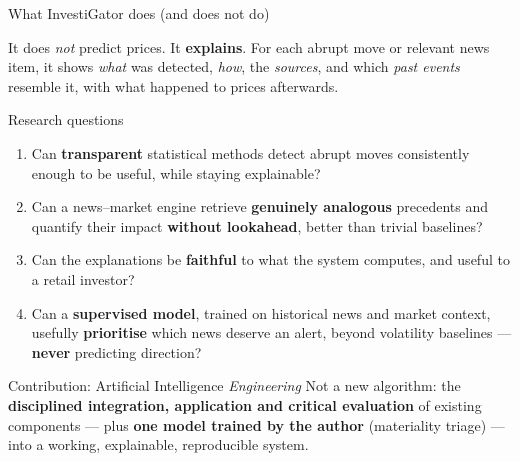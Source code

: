 \documentclass[aspectratio=169]{beamer}
\begin{document}
\begin{frame}{What InvestiGator does (and does not do)}
\begin{block}{It does \emph{not} predict prices. It \textbf{explains}.}
For each abrupt move or relevant news item, it shows \emph{what} was detected, \emph{how}, the \emph{sources}, and which \emph{past events} resemble it, with what happened to prices afterwards.
\end{block}
\centering
{}
\end{frame}

\begin{frame}{Research questions}
\begin{enumerate}
  \item[\textbf{RQ1}] Can \textbf{transparent} statistical methods detect abrupt moves consistently enough to be useful, while staying explainable?
  \item[\textbf{RQ2}] Can a news--market engine retrieve \textbf{genuinely analogous} precedents and quantify their impact \textbf{without lookahead}, better than trivial baselines?
  \item[\textbf{RQ3}] Can the explanations be \textbf{faithful} to what the system computes, and useful to a retail investor?
  \item[\textbf{RQ4}] Can a \textbf{supervised model}, trained on historical news and market context, usefully \textbf{prioritise} which news deserve an alert, beyond volatility baselines --- \textbf{never} predicting direction?
\end{enumerate}
\vfill
\begin{block}{Contribution: Artificial Intelligence \emph{Engineering}}
Not a new algorithm: the \textbf{disciplined integration, application and critical evaluation} of existing components --- plus \textbf{one model trained by the author} (materiality triage) --- into a working, explainable, reproducible system.
\end{block}
\end{frame}
\end{document}
